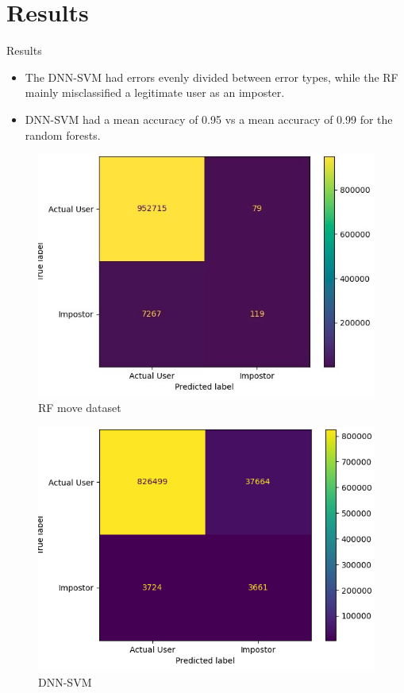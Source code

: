 \documentclass{beamer}
\begin{document}
\section{Results}
\begin{frame}{Results}
\begin{itemize}
    \item The DNN-SVM had errors evenly divided between error types, while the RF mainly misclassified a legitimate user as an imposter.
    \item DNN-SVM had a mean accuracy of 0.95 vs a mean accuracy of 0.99 for the random forests.
\end{itemize}
\begin{varwidth}{0.49\textwidth}
\begin{figure}
    \centering
    \includegraphics[width = \textwidth]{theme/images/confusion_matrix_rfm.png}
    \caption{RF move dataset}
    \label{fig:confusion_matrix_rfm}
\end{figure}
\end{varwidth}
\begin{varwidth}{0.49\textwidth}
\begin{figure}
    \centering
    \includegraphics[width=\textwidth]{theme/images/cnn_confusion_matrix.png}
    \caption{DNN-SVM}
    \label{fig:confusion_matrix_svm_cnn}
\end{figure}
\end{varwidth}
\end{frame}
\end{document}
